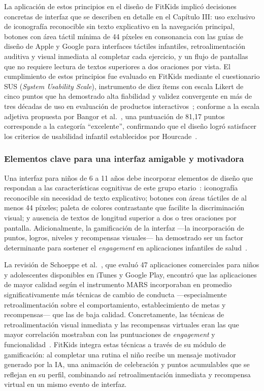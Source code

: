 					La aplicación de estos principios en el diseño de FitKids implicó decisiones concretas de interfaz que se describen en detalle en el Capítulo III: uso exclusivo de iconografía reconocible sin texto explicativo en la navegación principal, botones con área táctil mínima de 44 píxeles en consonancia con las guías de diseño de Apple y Google para interfaces táctiles infantiles, retroalimentación auditiva y visual inmediata al completar cada ejercicio, y un flujo de pantallas que no requiere lectura de textos superiores a dos oraciones por vista. El cumplimiento de estos principios fue evaluado en FitKids mediante el cuestionario SUS (\textit{System Usability Scale}), instrumento de diez ítems con escala Likert de cinco puntos que ha demostrado alta fiabilidad y validez convergente en más de tres décadas de uso en evaluación de productos interactivos~\cite{Lewis2018,Bangor2008}; conforme a la escala adjetiva propuesta por Bangor et al.~\cite{Bangor2008}, una puntuación de 81,17 puntos corresponde a la categoría ``excelente'', confirmando que el diseño logró satisfacer los criterios de usabilidad infantil establecidos por Hourcade~\cite{Hourcade2015}.
				
				\subsubsection{Elementos clave para una interfaz amigable y motivadora}
					Una interfaz para niños de 6 a 11 años debe incorporar elementos de diseño que respondan a las características cognitivas de este grupo etario~\cite{Hourcade2015}: iconografía reconocible sin necesidad de texto explicativo; botones con áreas táctiles de al menos 44 píxeles; paleta de colores contrastante que facilite la discriminación visual; y ausencia de textos de longitud superior a dos o tres oraciones por pantalla. Adicionalmente, la gamificación de la interfaz ---la incorporación de puntos, logros, niveles y recompensas visuales--- ha demostrado ser un factor determinante para sostener el \textit{engagement} en aplicaciones infantiles de salud~\cite{WangGamif2025}.
					
					La revisión de Schoeppe et al.~\cite{Schoeppe2017}, que evaluó 47 aplicaciones comerciales para niños y adolescentes disponibles en iTunes y Google Play, encontró que las aplicaciones de mayor calidad según el instrumento MARS incorporaban en promedio significativamente más técnicas de cambio de conducta ---especialmente retroalimentación sobre el comportamiento, establecimiento de metas y recompensas--- que las de baja calidad. Concretamente, las técnicas de retroalimentación visual inmediata y las recompensas virtuales eran las que mayor correlación mostraban con las puntuaciones de \textit{engagement} y funcionalidad~\cite{Schoeppe2017}. FitKids integra estas técnicas a través de su módulo de gamificación: al completar una rutina el niño recibe un mensaje motivador generado por la IA, una animación de celebración y puntos acumulables que se reflejan en su perfil, combinando así retroalimentación inmediata y recompensa virtual en un mismo evento de interfaz.
				
